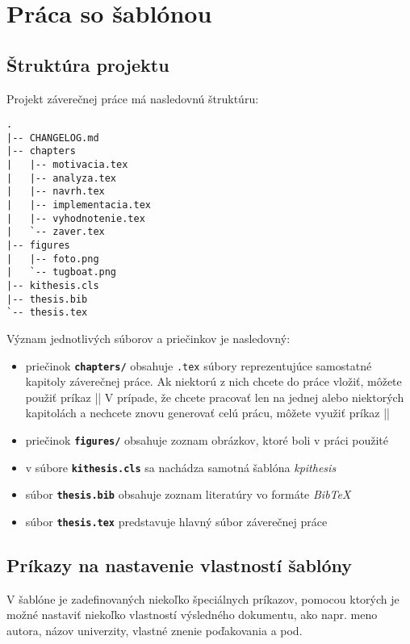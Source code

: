 \chapter{Práca so šablónou}
\label{ch:sablona}

\section{Štruktúra projektu}

Projekt záverečnej práce má nasledovnú štruktúru:

\begin{verbatim}
.
|-- CHANGELOG.md
|-- chapters
|   |-- motivacia.tex
|   |-- analyza.tex
|   |-- navrh.tex
|   |-- implementacia.tex
|   |-- vyhodnotenie.tex
|   `-- zaver.tex
|-- figures
|   |-- foto.png
|   `-- tugboat.png
|-- kithesis.cls
|-- thesis.bib
`-- thesis.tex
\end{verbatim}

Význam jednotlivých súborov a priečinkov je nasledovný:

\begin{itemize}
    \item priečinok {\tt \bf{chapters/}} obsahuje {\tt .tex} súbory reprezentujúce samostatné kapitoly záverečnej práce. Ak niektorú z nich chcete do práce vložiť, môžete použiť príkaz || V prípade, že chcete pracovať len na jednej alebo niektorých kapitolách a nechcete znovu generovať celú prácu, môžete využiť príkaz ||
    \item priečinok {\tt \bf{figures/}} obsahuje zoznam obrázkov, ktoré boli v práci použité
    \item v súbore {\tt \bf{kithesis.cls}} sa nachádza samotná šablóna \emph{kpithesis}
    \item súbor {\tt \bf{thesis.bib}} obsahuje zoznam literatúry vo formáte \emph{BibTeX}
    \item súbor {\tt \bf{thesis.tex}} predstavuje hlavný súbor záverečnej práce
\end{itemize}


\section{Príkazy na nastavenie vlastností šablóny}

V šablóne je zadefinovaných niekoľko špeciálnych príkazov, pomocou ktorých je možné nastaviť niekoľko vlastností výsledného dokumentu, ako napr. meno autora, názov univerzity, vlastné znenie poďakovania a pod.

